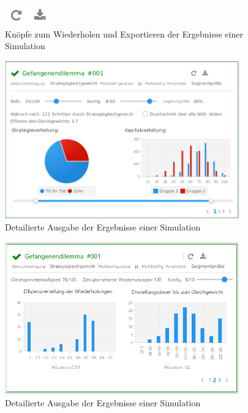 \documentclass[parskip=full,11pt]{scrartcl}
\begin{document}
\begin{figure}[ht]
	\centering
	\includegraphics{images/out_btn.png}
	\caption{\label{fig:out_btn}
		Knöpfe zum Wiederholen und Exportieren der Ergebnisse einer Simulation}
\end{figure}
\begin{figure}[H]
	\centering
	\includegraphics[width=0.9\textwidth]{images/home_out_multi_1.png}
	\caption{\label{fig:home_out_1}
		Detailierte Ausgabe der Ergebnisse einer Simulation}
\end{figure}
\begin{figure}[H]
	\centering
	\includegraphics[width=0.9\textwidth]{images/home_out_multi_2.png}
	\caption{\label{fig:home_out_2}
		Detailierte Ausgabe der Ergebnisse einer Simulation}
\end{figure}
\end{document}
